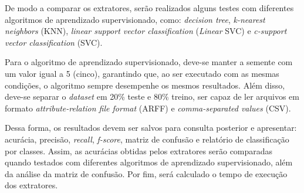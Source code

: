 \par De modo a comparar os extratores, serão realizados alguns testes com diferentes algoritmos de aprendizado supervisionado, como: \textit{decision tree}, \textit{k-nearest neighbors} (KNN), \textit{linear support vector classification} (\textit{Linear} SVC) e \textit{c-support vector classification} (SVC).

\par Para o algoritmo de aprendizado supervisionado, deve-se manter a semente com um valor igual a 5 (cinco), garantindo que, ao ser executado com as mesmas condições, o algoritmo sempre desempenhe os mesmos resultados. Além disso, deve-se separar o \textit{dataset} em 20\% teste e 80\% treino, ser capaz de ler arquivos em formato \textit{attribute-relation file format} (ARFF) e \textit{comma-separated values} (CSV).

\par Dessa forma, os resultados devem ser salvos para consulta posterior e apresentar: acurácia, precisão, \textit{recall}, \textit{f-score}, matriz de confusão e relatório de classificação por classes. Assim, as acurácias obtidas pelos extratores serão comparadas quando testados com diferentes algoritmos de aprendizado supervisionado, além da análise da matriz de confusão. Por fim, será calculado o tempo de execução dos extratores.

